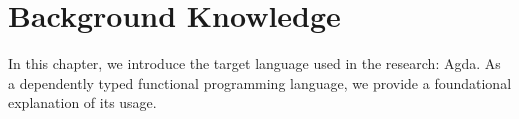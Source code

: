 \chapter{Background Knowledge}

In this chapter, we introduce the target language used in the research: Agda. 
As a dependently typed functional programming language, we provide a foundational explanation of its usage.










